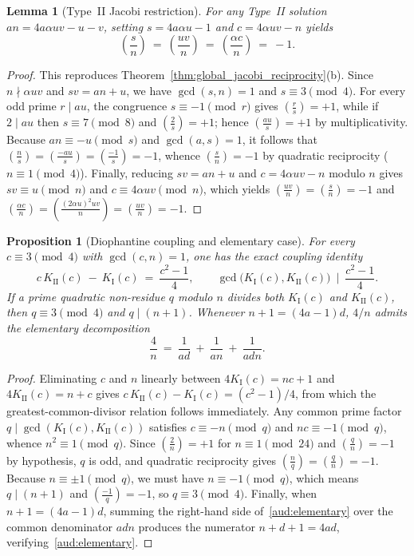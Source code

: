 \documentclass[11pt, a4paper]{article}
\theoremstyle{plain}
\newtheorem{lemma}[theorem]{Lemma}
\newtheorem{proposition}[theorem]{Proposition}
\theoremstyle{definition}
\newcommand{\leg}[2]{\left(\frac{#1}{#2}\right)}
\newcommand{\I}{\mathrm{I}}
\newcommand{\II}{\mathrm{II}}
\begin{document}
\begin{lemma}[Type~II Jacobi restriction]\label{aud:IIjacobi}
For any Type~II solution $an=4a\alpha uv-u-v$, setting $s=4a\alpha u-1$ and $c=4\alpha uv-n$ yields
\[
\leg{s}{n}\ =\ \leg{uv}{n}\ =\ \leg{\alpha c}{n}\ =\ -1.
\]
\end{lemma}
\begin{proof}
This reproduces Theorem~\ref{thm:global_jacobi_reciprocity}(b). Since $n\nmid\alpha uv$ and $sv=an+u$, we have $\gcd(s,n)=1$ and $s\equiv3\pmod 4$. For every odd prime $r\mid au$, the congruence $s\equiv -1\pmod r$ gives $\leg{r}{s}=+1$, while if $2\mid au$ then $s\equiv7\pmod 8$ and $\leg{2}{s}=+1$; hence $\leg{au}{s}=+1$ by multiplicativity. Because $an\equiv -u\pmod s$ and $\gcd(a,s)=1$, it follows that $\leg{n}{s}=\leg{-au}{s}=\leg{-1}{s}=-1$, whence $\leg{s}{n}=-1$ by quadratic reciprocity ($n\equiv1\pmod 4$). Finally, reducing $sv=an+u$ and $c=4\alpha uv-n$ modulo $n$ gives $sv\equiv u\pmod n$ and $c\equiv 4\alpha uv\pmod n$, which yields $\leg{uv}{n}=\leg{s}{n}=-1$ and $\leg{\alpha c}{n}=\leg{(2\alpha u)^{2}uv}{n}=\leg{uv}{n}=-1$.
\end{proof}

\begin{proposition}[Diophantine coupling and elementary case]\label{aud:coupling}
For every $c\equiv3\pmod 4$ with $\gcd(c,n)=1$, one has the exact coupling identity
\[
c\,K_{\II}(c)\ -\ K_{\I}(c)\ =\ \frac{c^{2}-1}{4},\qquad \gcd\!\big(K_{\I}(c),K_{\II}(c)\big)\ \mid\ \frac{c^{2}-1}{4}.
\]
If a prime quadratic non-residue $q$ modulo $n$ divides both $K_{\I}(c)$ and $K_{\II}(c)$, then $q\equiv3\pmod 4$ and $q\mid(n+1)$. Whenever $n+1=(4a-1)d$, $4/n$ admits the elementary decomposition
\begin{equation}\label{aud:elementary}
\frac{4}{n}\ =\ \frac{1}{ad}\ +\ \frac{1}{an}\ +\ \frac{1}{adn}.
\end{equation}
\end{proposition}
\begin{proof}
Eliminating $c$ and $n$ linearly between $4K_{\I}(c)=nc+1$ and $4K_{\II}(c)=n+c$ gives $c\,K_{\II}(c)-K_{\I}(c)=(c^{2}-1)/4$, from which the greatest-common-divisor relation follows immediately. Any common prime factor $q\mid\gcd(K_{\I}(c),K_{\II}(c))$ satisfies $c\equiv -n\pmod q$ and $nc\equiv -1\pmod q$, whence $n^{2}\equiv 1\pmod q$. Since $\leg{2}{n}=+1$ for $n\equiv 1\pmod{24}$ and $\leg{q}{n}=-1$ by hypothesis, $q$ is odd, and quadratic reciprocity gives $\leg{n}{q}=\leg{q}{n}=-1$. Because $n\equiv\pm 1\pmod q$, we must have $n\equiv -1\pmod q$, which means $q\mid(n+1)$ and $\leg{-1}{q}=-1$, so $q\equiv3\pmod 4$. Finally, when $n+1=(4a-1)d$, summing the right-hand side of~\eqref{aud:elementary} over the common denominator $adn$ produces the numerator $n+d+1=4ad$, verifying~\eqref{aud:elementary}.
\end{proof}
\end{document}
